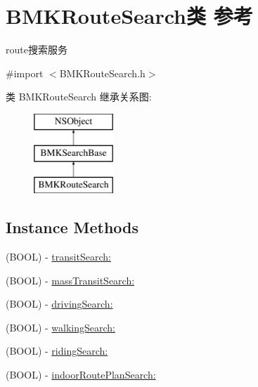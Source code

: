 \hypertarget{interface_b_m_k_route_search}{}\section{B\+M\+K\+Route\+Search类 参考}
\label{interface_b_m_k_route_search}


route搜索服务  




{\ttfamily \#import $<$B\+M\+K\+Route\+Search.\+h$>$}

类 B\+M\+K\+Route\+Search 继承关系图\+:\begin{figure}[H]
\begin{center}
\leavevmode
\includegraphics[height=3.000000cm]{interface_b_m_k_route_search}
\end{center}
\end{figure}
\subsection*{Instance Methods}
\begin{DoxyCompactItemize}
\item 
(B\+O\+O\+L) -\/ \hyperlink{interface_b_m_k_route_search_af5fd9df6e0d4940ca0a2bf7823dc95a8}{transit\+Search\+:}
\item 
(B\+O\+O\+L) -\/ \hyperlink{interface_b_m_k_route_search_a314cfb04dc9128fa33826230f81b2ee0}{mass\+Transit\+Search\+:}
\item 
(B\+O\+O\+L) -\/ \hyperlink{interface_b_m_k_route_search_a64bca1276cae03de35f61a0f733d6135}{driving\+Search\+:}
\item 
(B\+O\+O\+L) -\/ \hyperlink{interface_b_m_k_route_search_a40676ec66d861873d8e0117feb3e2483}{walking\+Search\+:}
\item 
(B\+O\+O\+L) -\/ \hyperlink{interface_b_m_k_route_search_a1cceee6f350063ac19be436b6fbe100a}{riding\+Search\+:}
\item 
(B\+O\+O\+L) -\/ \hyperlink{interface_b_m_k_route_search_af7ac0da169e905c27abe74c31eaef46a}{indoor\+Route\+Plan\+Search\+:}
\end{DoxyCompactItemize}
